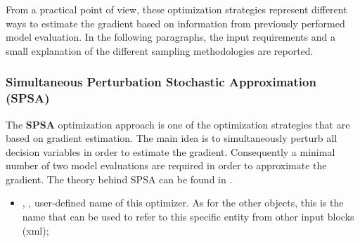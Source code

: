 From a practical point of view, these optimization strategies represent different ways to estimate the gradient based on information from previously performed model evaluation. In the following paragraphs, the input requirements and a small explanation of the different sampling methodologies are reported.


\subsubsection{Simultaneous Perturbation Stochastic Approximation (SPSA)}
\label{subsubsubsec:SPSA}
The \textbf{SPSA} optimization approach is one of the optimization strategies that are based on gradient estimation. The main idea is to simultaneously perturb all decision variables in order to estimate the gradient. Consequently a minimal number of two model evaluations are required in order to approximate the gradient. The theory behind SPSA can be found in \cite{spall1998implementation}.
%

%
\attrsIntro
\vspace{-5mm}
\begin{itemize}
\itemsep0em
\item {}, , user-defined name of this optimizer. \nb As for the other objects, this is the name that can be used to refer to this specific entity from other input blocks (xml);
\end{itemize}
\vspace{-5mm}

